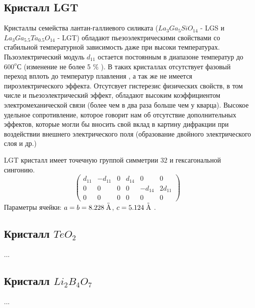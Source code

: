 \newpage
  \begin{center}
  \section{ }%
  \label{sec:piezo_matrix}
  \end{center}
  \subsection*{ Кристалл LGT }
  Кристаллы семейства лантан-галлиевого силиката ($La_3Ga_5SiO_{14}$ - LGS и $La_3Ga_{5.5}Ta_{0.5}O_{14}$ - LGT)
  обладают пьезоэлектрическими свойствами со стабильной температурной зависимость даже при высоки температурах.
  Пьзоэлектрический модуль $d_{11}$ остается постоянным в диапазоне температур до $600^o$С
  (изменение не более 5 $\%$ \cite{LGS58}). В таких кристаллах отсутствует фазовый переход вплоть
  до температур плавления \cite{LGS57}, а так же не имеется пироэлектрического эффекта.
  Отсутсвует гистерезис физических свойств, в том числе и пьезоэлектрический эффект,
  обладают высоким коэффициентом электромеханической связи (более чем в два раза больше чем у кварца).
  Высокое удельное сопротивление, которое говорит нам об отсутствие дополнительных эффектов,
  которые могли бы вносить свой вклад в картину дифракции при воздействии внешнего электрического
  поля (образование двойного электрического слоя и др.)

  LGT кристалл имеет точечную группой симметрии $32$ и гексагональной сингонию.
  \begin{equation}
    \begin{pmatrix}
    d_{11} & -d_{11} & 0 & d_{14} & 0 & 0 \\
    0 & 0 & 0 & 0 & -d_{14} & 2d_{11} \\
    0 & 0 & 0 & 0 & 0 & 0
    \end{pmatrix}
    \label{eq:piezomodule_lgt_matrica}
  \end{equation}
  Параметры ячейки: $a = b = 8.228 \angstrom$, $c = 5.124 \angstrom$ \cite{marchenkov2014}.

  \subsection*{ Кристалл $TeO_2$ }
  ...
  \subsection*{ Кристалл $Li_2B_4O_7$ }
  ...
